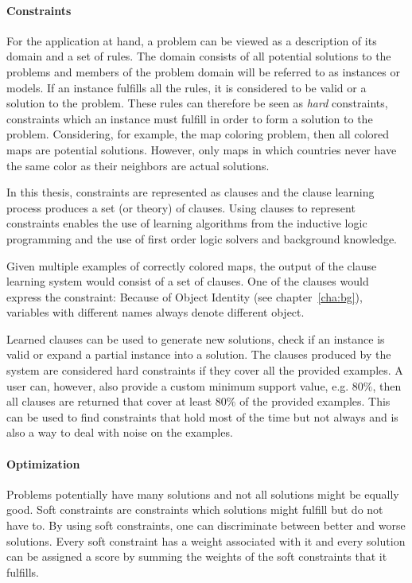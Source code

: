 \paragraph{Constraints}
For the application at hand, a problem can be viewed as a description of its domain and a set of rules.
The domain consists of all potential solutions to the problems and members of the problem domain will be referred to as instances or models.
If an instance fulfills all the rules, it is considered to be valid or a solution to the problem.
These rules can therefore be seen as \textit{hard} constraints, constraints which an instance must fulfill in order to form a solution to the problem.
Considering, for example, the map coloring problem, then all colored maps are potential solutions.
However, only maps in which countries never have the same color as their neighbors are actual solutions.

In this thesis, constraints are represented as clauses and the clause learning process produces a set (or theory) of clauses.
Using clauses to represent constraints enables the use of learning algorithms from the inductive logic programming and the use of first order logic solvers and background knowledge.

\begin{example}
Given multiple examples of correctly colored maps, the output of the clause learning system would consist of a set of clauses. One of the clauses would express the constraint: 
Because of Object Identity (see chapter~\ref{cha:bg}), variables with different names always denote different object.
\end{example}

Learned clauses can be used to generate new solutions, check if an instance is valid or expand a partial instance into a solution.
The clauses produced by the system are considered hard constraints if they cover all the provided examples.
A user can, however, also provide a custom minimum support value, e.g. $80\%$, then all clauses are returned that cover at least $80\%$ of the provided examples.
This can be used to find constraints that hold most of the time but not always and is also a way to deal with noise on the examples.

\paragraph{Optimization}
Problems potentially have many solutions and not all solutions might be equally good.
Soft constraints are constraints which solutions might fulfill but do not have to.
By using soft constraints, one can discriminate between better and worse solutions.
Every soft constraint has a weight associated with it and every solution can be assigned a score by summing the weights of the soft constraints that it fulfills.

